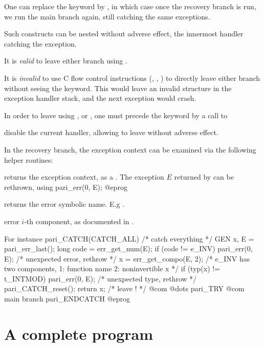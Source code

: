 One can replace the  keyword by , in which case
once the recovery branch is run, we run the main branch again, still catching
the same exceptions.


\item Such constructs can be nested without adverse effect, the innermost
handler catching the exception.

\item It is \emph{valid} to leave either branch using .

\item It is \emph{invalid} to use C flow control instructions (,
, ) to directly leave either branch without seeing
the  keyword. This would leave an invalid structure in the
exception handler stack, and the next exception would crash.

\item In order to leave using ,  or ,
one must precede the keyword by a call to

 disable the current handler, allowing to leave
without adverse effect.


In the recovery branch, the exception context can be examined via the
following helper routines:

 returns the exception context, as a .
The exception $E$ returned by  can be rethrown, using
\bprog
  pari_err(0, E);
@eprog

 returns the error symbolic name. E.g
.

 error $i$-th component, as documented
in .

\noindent For instance
\bprog
 pari_CATCH(CATCH_ALL) { /* catch everything */
    GEN x, E = pari_err_last();
    long code = err_get_num(E);
    if (code != e_INV) pari_err(0, E); /* unexpected error, rethrow */
    x = err_get_compo(E, 2);
    /* e_INV has two components, 1: function name 2: noninvertible x */
    if (typ(x) != t_INTMOD) pari_err(0, E); /* unexpected type, rethrow */
    pari_CATCH_reset();
    return x; /* leave ! */
    @com @dots
 } pari_TRY {
   @com main branch
 }
 pari_ENDCATCH
@eprog

\section{A complete program}
\label{se:prog}

